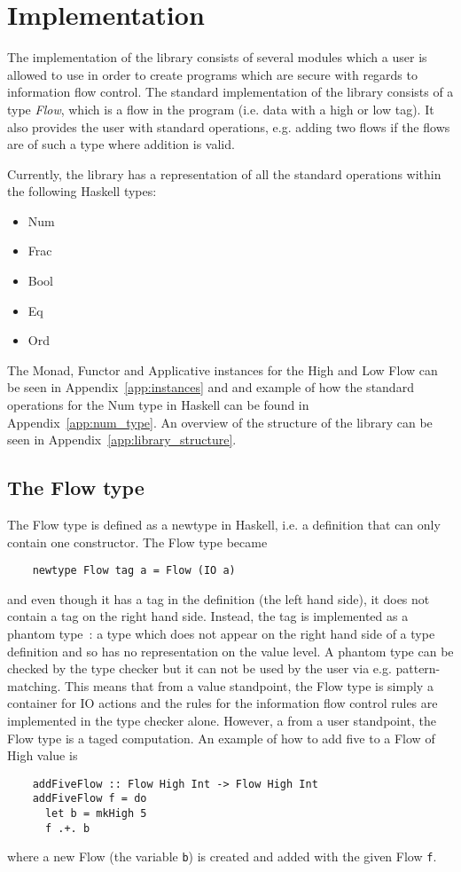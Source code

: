\chapter{Implementation}
\label{chapter:implementation}
The implementation of the library consists of several modules which a user is allowed to use in order to create programs which are secure with regards to information flow control. The standard implementation of the library consists of a type \emph{Flow}, which is a flow in the program (i.e. data with a high or low tag). It also provides the user with standard operations, e.g. adding two flows if the flows are of such a type where addition is valid.

Currently, the library has a representation of all the standard operations within the following Haskell types:
\begin{itemize}
  \item Num
  \item Frac
  \item Bool
  \item Eq
  \item Ord
\end{itemize}

The Monad, Functor and Applicative instances for the High and Low Flow can be seen in Appendix~\ref{app:instances} and and example of how the standard operations for the Num type in Haskell can be found in Appendix~\ref{app:num_type}. An overview of the structure of the library can be seen in Appendix~\ref{app:library_structure}.
\section{The Flow type}
\label{sec:flow}
The Flow type is defined as a newtype in Haskell, i.e. a definition that can only contain one constructor. The Flow type became
\begin{verbatim}
    newtype Flow tag a = Flow (IO a)
\end{verbatim}
and even though it has a tag in the definition (the left hand side), it does not contain a tag on the right hand side. Instead, the tag is implemented as a phantom type~\cite{haskell_phantom}: a type which does not appear on the right hand side of a type definition and so has no representation on the value level. A phantom type can be checked by the type checker but it can not be used by the user via e.g. pattern-matching. This means that from a value standpoint, the Flow type is simply a container for IO actions and the rules for the information flow control rules are implemented in the type checker alone. However, a from a user standpoint, the Flow type is a taged computation. An example of how to add five to a Flow of High value is
\begin{verbatim}
    addFiveFlow :: Flow High Int -> Flow High Int
    addFiveFlow f = do
      let b = mkHigh 5
      f .+. b
\end{verbatim}
where a new Flow (the variable {\tt b}) is created and added with the given Flow {\tt f}.

